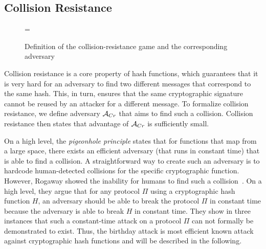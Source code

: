 \subsection{Collision Resistance}
\begin{figure}
\centering 


\vspace{0.1in}


\bnm
{} = 
\enm

    \caption{Definition of the collision-resistance game and the corresponding adversary}
    \label{fig:cr-game}
\end{figure}

Collision resistance is a core property of hash functions, which guarantees that it is very hard for an adversary to find two different messages that correspond to the same hash.
This, in turn, ensures that the same cryptographic signature cannot be reused by an attacker for a different message.
To formalize collision resistance, we define adversary ${\mathcal A}_{Cr}$ that aims to find such a collision. Collision resistance then states that advantage of ${\mathcal A}_{Cr}$ is sufficiently small.

On a high level, the \emph{pigeonhole principle} states that for functions that map from a large space, there exists an efficient adversary (that runs in constant time) that is able to find a collision.
A straightforward way to create such an adversary is to hardcode human-detected collisions for the specific cryptographic function.
However, Rogaway showed the inability for humans to find such a collision~\cite{rogaway2006formalizing}. 
On a high level, they argue that for any protocol $\Pi$ using a cryptographic hash function $H$, an adversary should be able to break the protocol $\Pi$ in constant time because the adversary is able to break $H$ in constant time.
They show in three instances that such a constant-time attack on a protocol $\Pi$ can not formally be demonstrated to exist.
Thus, the birthday attack is most efficient known attack against cryptographic hash functions and will be described in the following.

